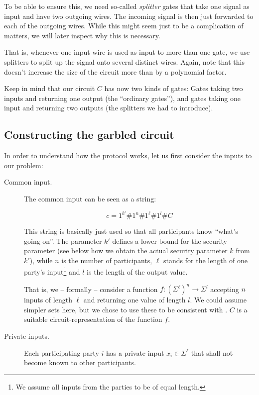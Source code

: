 To be able to ensure this, we need so-called \emph{splitter} gates that take one signal as input and have two outgoing wires. The incoming signal is then just forwarded to each of the outgoing wires. While this might seem just to be a complication of matters, we will later inspect why this is necessary.

That is, whenever one input wire is used as input to more than one gate, we use splitters to split up the signal onto several distinct wires. Again, note that this doesn't increase the size of the circuit more than by a polynomial factor.

Keep in mind that our circuit $C$ has now two kinds of gates: Gates taking two inputs and returning one output (the ``ordinary gates''), and gates taking one input and returning two outputs (the splitters we had to introduce).

\subsection{Constructing the garbled circuit}
\label{sec:protocol-construct-garbled-circuit}

In order to understand how the protocol works, let us first consider the inputs to our problem:

\begin{description}
\item[Common input.] The common input can be seen as a string:

  \begin{equation*}
    c=1^{k'}\#1^n\#1^\ell\#1^l
    \#C
  \end{equation*}

This string is basically just used so that all participants know ``what's going on''. The parameter $k'$ defines a lower bound for the security parameter (see below how we obtain the actual security parameter $k$ from $k'$), while $n$ is the number of participants, $\ell$ stands for the length of one party's input\footnote{We assume all inputs from the parties to be of equal length.} and $l$ is the length of the output value.

That is, we -- formally -- consider a function $f:(\Sigma^\ell)^n\rightarrow \Sigma^l$ accepting $n$ inputs of length $\ell$ and returning one value of length $l$. We could assume simpler sets here, but we chose to use these to be consistent with \cite{Rogaway:1991:RCS:888502}. $C$ is a suitable circuit-representation of the function $f$. 


\item[Private inputs.] Each participating party $i$ has a private input $x_i\in\Sigma ^\ell$ that shall not become known to other participants.
\end{description}

